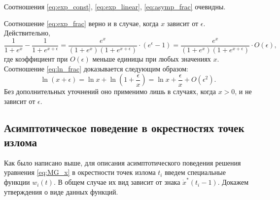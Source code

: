 Соотношения \eqref{eq:exp_const}, \eqref{eq:exp_linear}, \eqref{eq:asymp_frac} очевидны.

Соотношение \eqref{eq:exp_frac} верно и в случае, когда $x$ зависит от $\epsilon$. Действительно,
%
\[
\dfrac{1}{1 + e^x} - \dfrac{1}{1 + e^{x + \epsilon}} = \dfrac{e^x}{(1 + e^x)(1 + e^{x + \epsilon})} \cdot (e^{\epsilon} - 1) = \dfrac{e^x}{(1 + e^x)(1 + e^{x + \epsilon})} \cdot O(\epsilon),
\]
где коэффициент при $O(\epsilon)$ меньше единицы при любых значениях $x$.
%
Соотношение \eqref{eq:ln_frac} доказывается следующим образом:
\[
\ln(x + \epsilon) = \ln x + \ln\left(1 + \frac{\epsilon}{x}\right) = \ln x + \frac{\epsilon}{x} + O(\epsilon^2).
\]
Без дополнительных уточнений оно применимо лишь в случаях, когда $x > 0$, и не зависит от $\epsilon$.

\subsection{Асимптотическое поведение в окрестностях точек излома}
\label{subsect:ch1:w_func}

Как было написано выше, для описания асимптотического поведения решения уравнения \eqref{eq:MG_x} в окрестности точек излома $t_i$ введем специальные функции $w_i(t)$. В общем случае их вид зависит от знака $\dot{x}^*(t_i - 1)$. Докажем утверждения о виде данных функций.


